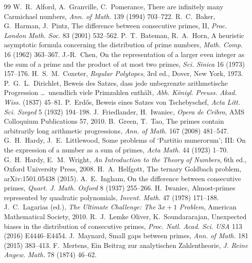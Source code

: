 \documentclass[11pt,a4paper]{article}
\theoremstyle{plain}
\theoremstyle{definition}
\theoremstyle{remark}
\begin{document}
\begin{thebibliography}{99}\small
\setlength{\itemsep}{1pt}
 W.~R.~Alford, A.~Granville, C.~Pomerance, There are infinitely many
Carmichael numbers, \emph{Ann. of Math.} 139 (1994) 703--722.
 R.~C.~Baker, G.~Harman, J.~Pintz, The difference between
consecutive primes, II, \emph{Proc. London Math. Soc.} 83 (2001) 532--562.
 P.~T.~Bateman, R.~A.~Horn, A heuristic asymptotic
formula concerning the distribution of prime numbers, \emph{Math. Comp.} 16
(1962) 363--367.
 J.-R.~Chen, On the representation of a larger even integer as
the sum of a prime and the product of at most two primes, \emph{Sci. Sinica}
16 (1973) 157--176.
 H.~S.~M.~Coxeter, \emph{Regular Polytopes}, 3rd ed., Dover,
New York, 1973.
 P.~G.~L.~Dirichlet, Beweis des Satzes, dass jede
unbegrenzte arithmetische Progression \dots\ unendlich viele Primzahlen
enthält, \emph{Abh. Königl. Preuss. Akad. Wiss.} (1837) 45--81.
 P.~Erd\H{o}s, Beweis eines Satzes von Tschebyschef, \emph{Acta
Litt. Sci. Szeged} 5 (1932) 194--198.
 J.~Friedlander, H.~Iwaniec, \emph{Opera de
Cribro}, AMS Colloquium Publications 57, 2010.
 B.~Green, T.~Tao, The primes contain arbitrarily long
arithmetic progressions, \emph{Ann. of Math.} 167 (2008) 481--547.
 G.~H.~Hardy, J.~E.~Littlewood, Some problems of `Partitio
numerorum'; III: On the expression of a number as a sum of primes, \emph{Acta
Math.} 44 (1923) 1--70.
 G.~H.~Hardy, E.~M.~Wright, \emph{An Introduction to the
Theory of Numbers}, 6th ed., Oxford University Press, 2008.
 H.~A.~Helfgott, The ternary Goldbach problem,
arXiv:1501.05438 (2015).
 A.~E.~Ingham, On the difference between consecutive primes,
\emph{Quart. J. Math. Oxford} 8 (1937) 255--266.
 H.~Iwaniec, Almost-primes represented by quadratic
polynomials, \emph{Invent. Math.} 47 (1978) 171--188.
 J.~C.~Lagarias (ed.), \emph{The Ultimate Challenge: The
$3x+1$ Problem}, American Mathematical Society, 2010.
 R.~J.~Lemke Oliver, K.~Soundararajan, Unexpected biases in the
distribution of consecutive primes, \emph{Proc. Natl. Acad. Sci. USA} 113
(2016) E4446--E4454.
 J.~Maynard, Small gaps between primes, \emph{Ann. of Math.}
181 (2015) 383--413.
 F.~Mertens, Ein Beitrag zur analytischen Zahlentheorie,
\emph{J. Reine Angew. Math.} 78 (1874) 46--62.

\end{thebibliography}
\end{document}

